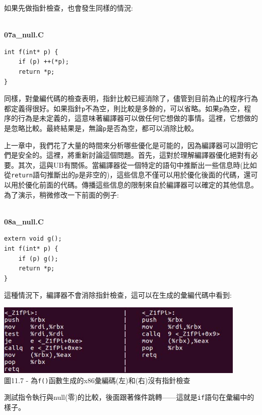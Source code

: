 如果先做指針檢查，也會發生同樣的情況:

\hspace*{\fill} \\ %
\noindent
\textbf{07a\_null.C}
\begin{lstlisting}[style=styleCXX]
int f(int* p) {
	if (p) ++(*p);
	return *p;
}
\end{lstlisting}

同樣，對彙編代碼的檢查表明，指針比較已經消除了，儘管到目前為止的程序行為都定義得很好。如果指針\texttt{p}不為空，則比較是多餘的，可以省略。如果\texttt{p}為空，程序的行為是未定義的，這意味著編譯器可以做任何它想做的事情。這裡，它想做的是忽略比較。最終結果是，無論\texttt{p}是否為空，都可以消除比較。

上一章中，我們花了大量的時間來分析哪些優化是可能的，因為編譯器可以證明它們是安全的。這裡，將重新討論這個問題。首先，這對於理解編譯器優化絕對有必要。其次，這與UB有關係。當編譯器從一個特定的語句中推斷出一些信息時(比如從\texttt{return}語句推斷出的\texttt{p}是非空的)，這些信息不僅可以用於優化後面的代碼，還可以用於優化前面的代碼。傳播這些信息的限制來自於編譯器可以確定的其他信息。為了演示，稍微修改一下前面的例子:

\hspace*{\fill} \\ %
\noindent
\textbf{08a\_null.C}
\begin{lstlisting}[style=styleCXX]
extern void g();
int f(int* p) {
	if (p) g();
	return *p;
}
\end{lstlisting}

這種情況下，編譯器不會消除指針檢查，這可以在生成的彙編代碼中看到:

\begin{center}
\includegraphics[width=0.9\textwidth]{content/3/chapter11/images/7.jpg}\\
圖11.7 - 為\texttt{f()}函數生成的x86彙編碼(左)和(右)沒有指針檢查
\end{center}

測試指令執行與null(零)的比較，後面跟著條件跳轉——這就是\texttt{if}語句在彙編中的樣子。 

